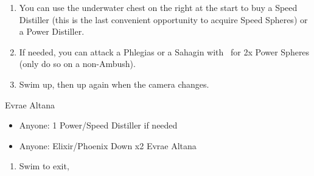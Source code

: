 \begin{enumerate}[resume]
    \item You can use the underwater chest on the right at the start to buy a Speed Distiller (this is the last convenient opportunity to acquire Speed Spheres) or a Power Distiller.
    \item If needed, you can attack a Phlegias or a Sahagin with \tidus\ for 2x Power Spheres (only do so on a non-Ambush).
    \item Swim up, then up again when the camera changes. 
\end{enumerate}
\begin{battle}{Evrae Altana}
    \begin{itemize}
        \item Anyone: 1 Power/Speed Distiller if needed
        \item Anyone: Elixir/Phoenix Down x2 Evrae Altana
    \end{itemize}
\end{battle}
\begin{enumerate}[resume]
    \item Swim to exit, \sd
\end{enumerate}
\ 
\bothvfill
\ \bothnewline
\bothcb
\ 

\bothnpsingle